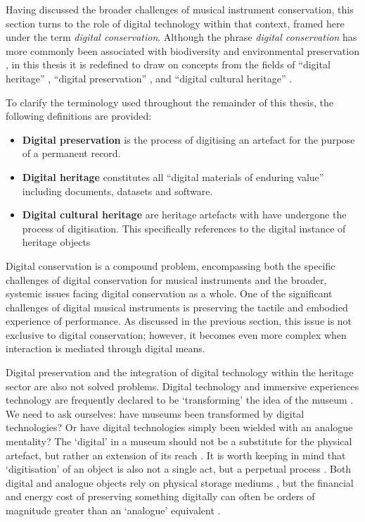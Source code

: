 Having discussed the broader challenges of musical instrument conservation, this
section turns to the role of digital technology within that context, framed here
under the term \emph{digital conservation}. Although the phrase \emph{digital
conservation} has more commonly been associated with biodiversity and
environmental preservation \cite{vanderwal_digital_2015}, in this thesis it is
redefined to draw on concepts from the fields of ``digital heritage''
\cite{unesco_heritage_2003}, ``digital preservation''
\cite{garrett_preserving_1996}, and ``digital cultural heritage''
\cite{fresa_digital_2014}.


To clarify the terminology used throughout the remainder of this thesis, the
following definitions are provided:

\begin{itemize}
    \item \textbf{Digital preservation} is the process of digitising an artefact
    for the purpose of a permanent record.
    \item \textbf{Digital heritage} constitutes all ``digital materials of
    enduring value'' \cite{unesco_heritage_2003} including documents, datasets
    and software.
    \item \textbf{Digital cultural heritage} are heritage artefacts with have
    undergone the process of digitisation. This specifically references to the
    digital instance of heritage objects
\end{itemize}

Digital conservation is a compound problem, encompassing both the specific
challenges of digital conservation for musical instruments and the broader,
systemic issues facing digital conservation as a whole. One of the significant
challenges of digital musical instruments is preserving the tactile and embodied
experience of performance. As discussed in the previous section, this issue is
not exclusive to digital conservation; however, it becomes even more complex
when interaction is mediated through digital means.

Digital preservation and the integration of digital technology within the
heritage sector are also not solved problems. Digital technology and immersive
experiences technology are frequently declared to be `transforming' the idea of
the museum \cite{gedert_technology_2017, li_systematic_2024,
dutot_changing_2021}. We need to ask ourselves: have museums been transformed by
digital technologies? Or have digital technologies simply been wielded with an
analogue mentality? The `digital' in a museum should not be a substitute for the
physical artefact, but rather an extension of its reach
\cite{foster_defining_1998, parry_museums_2010}. It is worth keeping in mind
that `digitisation' of an object is also not a single act, but a perpetual
process \cite{rubio_work_2020, kelley_digital_2018}. Both digital and analogue
objects rely on physical storage mediums \cite{rubio_work_2020}, but the
financial and energy cost of preserving something digitally can often be orders
of magnitude greater than an `analogue' equivalent \cite{cieply_afterlife_2007}.

